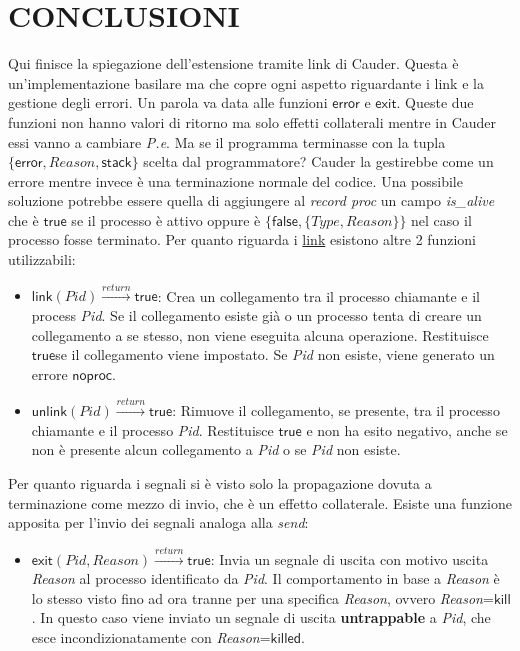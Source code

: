 \documentclass[Tesi.tex]{subfiles}
\begin{document}
\section{CONCLUSIONI}
Qui finisce la spiegazione dell'estensione tramite link di Cauder.
Questa è un'implementazione basilare ma che copre ogni aspetto riguardante i link e la gestione degli errori.
Un parola va data alle funzioni $\mathsf{error}$ e $\mathsf{exit}$.
Queste due funzioni non hanno valori di ritorno ma solo effetti collaterali mentre in Cauder essi vanno a cambiare \textit{P.e}.
Ma se il programma terminasse con la tupla $\displaystyle \{\mathsf{error},Reason,\mathsf{stack}\}$ scelta dal programmatore?
Cauder la gestirebbe come un errore mentre invece è una terminazione normale del codice.
Una possibile soluzione potrebbe essere quella di aggiungere al \textit{record proc} un campo \textit{is\_alive} che è $\mathsf{true}$ se il processo è attivo oppure è $\displaystyle \{\mathsf{false},\{Type,Reason\}\}$ nel caso il processo fosse terminato. 
Per quanto riguarda i \underline{link} esistono altre 2 funzioni utilizzabili:
\begin{itemize}
	\item $\displaystyle \mathsf{link}(Pid)\xrightarrow{return}\mathsf{true}$: Crea un collegamento tra il processo chiamante e il process \textit{Pid}. Se il collegamento esiste già o un processo tenta di creare un collegamento a se stesso, non viene eseguita alcuna operazione. Restituisce $\mathsf{true}$se il collegamento viene impostato.
	Se \textit{Pid} non esiste, viene generato un errore $\mathsf{noproc}$.
	\item $\displaystyle \mathsf{unlink}(Pid)\xrightarrow{return}\mathsf{true}$: Rimuove il collegamento, se presente, tra il processo chiamante e il processo \textit{Pid}. Restituisce $\mathsf{true}$ e non ha esito negativo, anche se non è presente alcun collegamento a \textit{Pid} o se \textit{Pid} non esiste.
\end{itemize}
Per quanto riguarda i segnali si è visto solo la propagazione dovuta a terminazione come mezzo di invio, che è un effetto collaterale.
Esiste una funzione apposita per l'invio dei segnali analoga alla \textit{send}:
\begin{itemize}
	\item $\displaystyle \mathsf{exit}(Pid,Reason)\xrightarrow{return}\mathsf{true}$: Invia un segnale di uscita con motivo uscita \textit{Reason} al processo identificato da \textit{Pid}.
	Il comportamento in base a \textit{Reason} è lo stesso visto fino ad ora tranne per una specifica \textit{Reason}, ovvero \textit{Reason}=$\mathsf{kill}$.
	In questo caso  viene inviato un segnale di uscita \textbf{untrappable} a \textit{Pid}, che esce incondizionatamente con \textit{Reason}=$\mathsf{killed}$.
\end{itemize}
\end{document}

